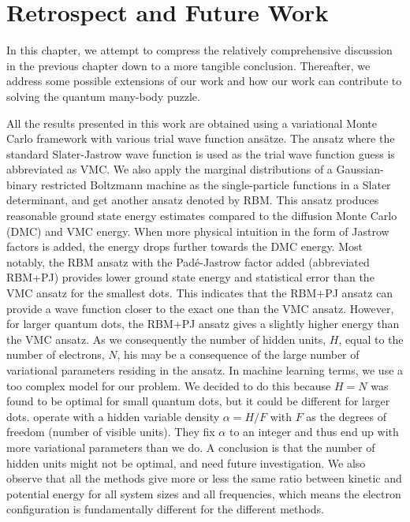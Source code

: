 \chapter{Retrospect and Future Work} \label{sec:conclusion}
In this chapter, we attempt to compress the relatively comprehensive discussion in the previous chapter down to a more tangible conclusion. Thereafter, we address some possible extensions of our work and how our work can contribute to solving the quantum many-body puzzle. 

All the results presented in this work are obtained using a variational Monte Carlo framework with various trial wave function ansätze. The ansatz where the standard Slater-Jastrow wave function is used as the trial wave function guess is abbreviated as VMC. We also apply the marginal distributions of a Gaussian-binary restricted Boltzmann machine as the single-particle functions in a Slater determinant, and get another ansatz denoted by RBM. This ansatz produces reasonable ground state energy estimates compared to the diffusion Monte Carlo (DMC) and VMC energy. When more physical intuition in the form of Jastrow factors is added, the energy drops further towards the DMC energy. Most notably, the RBM ansatz with the Padé-Jastrow factor added (abbreviated RBM+PJ) provides lower ground state energy and statistical error than the VMC ansatz for the smallest dots. This indicates that the RBM+PJ ansatz can provide a wave function closer to the exact one than the VMC ansatz. However, for larger quantum dots, the RBM+PJ ansatz gives a slightly higher energy than the VMC ansatz. As we consequently the number of hidden units, $H$, equal to the number of electrons, $N$, his may be a consequence of the large number of variational parameters residing in the ansatz. In machine learning terms, we use a too complex model for our problem. We decided to do this because $H=N$ was found to be optimal for small quantum dots\supercite{flugsrud_vilde_moe_solving_nodate}, but it could be different for larger dots. \citet{carleo_solving_2017} operate with a hidden variable density $\alpha=H/F$ with $F$ as the degrees of freedom (number of visible units). They fix $\alpha$ to an integer and thus end up with more variational parameters than we do. A conclusion is that the number of hidden units might not be optimal, and need future investigation. We also observe that all the methods give more or less the same ratio between kinetic and potential energy for all system sizes and all frequencies, which means the electron configuration is fundamentally different for the different methods.

